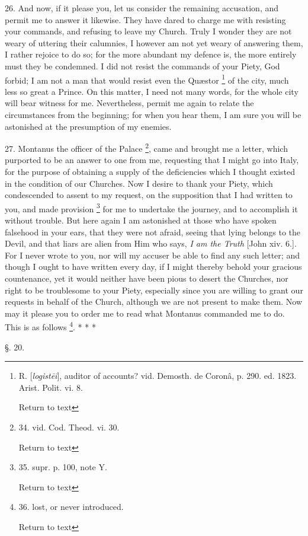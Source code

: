 26. And now, if it please you, let us consider the remaining accusation,
and permit me to answer it likewise. They have dared to charge me with
resisting your commands, and refusing to leave my Church. Truly I
wonder they are not weary of uttering their calumnies, I however am
not yet weary of answering them, I rather rejoice to do so; for the
more abundant my defence is, the more entirely must they be condemned.
I did not resist the commands of your Piety, God forbid; I am not a
man that would resist even the Quæstor \footnote{R. [\emph{logist\={e}i}],
auditor of accounts? vid. Demosth. de Coronâ, p. 290. ed. 1823. Arist.
Polit. vi. 8.

Return to text} of the city, much less so great a Prince. On this matter, I
need not many words, for the whole city will bear witness for me.
Nevertheless, permit me again to relate the circumstances from the
beginning; for when you hear them, I am sure you will be astonished at
the presumption of my enemies.

27. Montanus the officer of the Palace \footnote{34. vid. Cod. Theod. vi. 30.

Return to text}, came and brought me a letter, which purported to be an answer
to one from me, requesting that I might go into Italy, for the purpose
of obtaining a supply of the deficiencies which I thought existed in
the condition of our Churches. Now I desire to thank your Piety, which
condescended to assent to my request, on the supposition that I had
written to you, and made provision \footnote{35. supr. p. 100, note Y.

Return to text} for me to undertake the journey, and to accomplish it without
trouble. But here again I am astonished at those who have spoken
falsehood in your ears, that they were not afraid, seeing that lying
belongs to the Devil, and that liars are alien from Him who says, \emph{I am the Truth} [John xiv. 6.]. For I never wrote to you, nor will
my accuser be able to find any such letter; and though I ought to have
written every day, if I might thereby behold your gracious
countenance, yet it would neither have been pious to desert the
Churches, nor right to be troublesome to your Piety, especially since
you are willing to grant our requests in behalf of the Church,
although we are not present to make them. Now may it please you
to order me to read what Montanus commanded me to do. This is as
follows \footnote{36. lost, or never introduced.

Return to text}. *
* *

§. 20.

